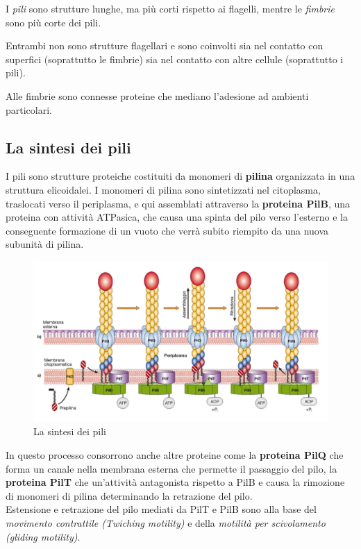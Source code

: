 \documentclass[11pt]{book}
\begin{document}
I \emph{pili} sono strutture lunghe, ma più corti rispetto ai flagelli, mentre le \emph{fimbrie} sono più corte dei pili.

Entrambi non sono strutture flagellari e sono coinvolti sia nel contatto con superfici (soprattutto le fimbrie) sia nel contatto con altre cellule (soprattutto i pili).

\vspace{1em}
Alle fimbrie sono connesse proteine che mediano l'adesione ad ambienti particolari.\\


\subsection{La sintesi dei pili}
I pili sono strutture proteiche costituiti da monomeri di \textbf{pilina} organizzata in una struttura elicoidalei. I monomeri di pilina sono sintetizzati nel citoplasma, traslocati verso il periplasma, e qui assemblati attraverso la \textbf{proteina PilB}, una proteina con attività ATPasica, che causa una spinta del pilo verso l’esterno e la conseguente formazione di un vuoto che verrà subito riempito da una nuova subunità di pilina.

\begin{figure}[htp]
\centering
\includegraphics[scale=0.4]{img/Sintesi pili.png}
\caption{La sintesi dei pili}
\label{}
\end{figure}

In questo processo consorrono anche altre proteine come la \textbf{proteina PilQ} che forma un canale nella membrana esterna che permette il passaggio del pilo, la \textbf{proteina PilT} che un'attività antagonista rispetto a PilB e causa la rimozione di monomeri di pilina determinando la retrazione del pilo.\\
Estensione e retrazione del pilo mediati da PilT e PilB sono alla base del \emph{movimento contrattile (Twiching motility)} e della \emph{motilità per scivolamento (gliding motility)}.
\end{document}
